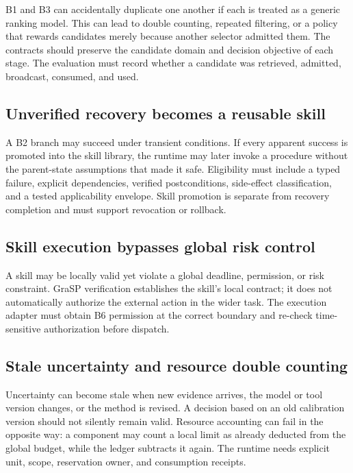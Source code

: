B1 and B3 can accidentally duplicate one another if each is treated as a generic ranking model. This can lead to double counting, repeated filtering, or a policy that rewards candidates merely because another selector admitted them. The contracts should preserve the candidate domain and decision objective of each stage. The evaluation must record whether a candidate was retrieved, admitted, broadcast, consumed, and used.

\subsection{Unverified recovery becomes a reusable skill}
\label{subsec:ch18-unsafe-skill-promotion}

A B2 branch may succeed under transient conditions. If every apparent success is promoted into the skill library, the runtime may later invoke a procedure without the parent-state assumptions that made it safe. Eligibility must include a typed failure, explicit dependencies, verified postconditions, side-effect classification, and a tested applicability envelope. Skill promotion is separate from recovery completion and must support revocation or rollback.

\subsection{Skill execution bypasses global risk control}
\label{subsec:ch18-skill-bypasses-risk}

A skill may be locally valid yet violate a global deadline, permission, or risk constraint. GraSP verification establishes the skill's local contract; it does not automatically authorize the external action in the wider task. The execution adapter must obtain B6 permission at the correct boundary and re-check time-sensitive authorization before dispatch.

\subsection{Stale uncertainty and resource double counting}
\label{subsec:ch18-stale-uncertainty}

Uncertainty can become stale when new evidence arrives, the model or tool version changes, or the method is revised. A decision based on an old calibration version should not silently remain valid. Resource accounting can fail in the opposite way: a component may count a local limit as already deducted from the global budget, while the ledger subtracts it again. The runtime needs explicit unit, scope, reservation owner, and consumption receipts.

